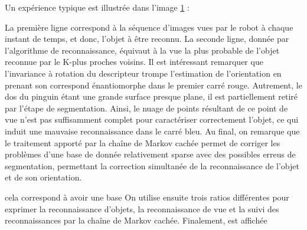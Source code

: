 Un expérience typique est illustrée dans l'image \ref{fig:resultats_expe} :

\begin{figure}[H]
			\caption{}
	\label{fig:resultats_expe}
\end{figure}

La première ligne correspond à la séquence d'images vues par le robot à chaque instant de temps, et donc, l'objet à être reconnu. La seconde ligne, donnée par l'algorithme de reconnaissance, équivaut à la vue la plus probable de l'objet reconnue par le K-plus proches voisins. Il est intéressant remarquer que l'invariance à rotation du descripteur trompe l'estimation de l'orientation en prenant son correspond énantiomorphe dans le premier carré rouge. Autrement, le dos du pinguin étant une grande surface presque plane, il est partiellement retiré par l'étape de segmentation. Ainsi, le nuage de points résultant de ce point de vue n'est pas suffisamment complet pour caractériser correctement l'objet, ce qui induit une mauvaise reconnaissance dans le carré bleu. Au final, on remarque que le traitement apporté par la chaîne de Markov cachée permet de corriger les problèmes d'une base de donnée relativement sparse avec des possibles erreus de segmentation, permettant la correction simultanée de la reconnaissance de l'objet et de son orientation. 

cela correspond à avoir une base
On utilise ensuite trois ratios différentes pour exprimer la reconnaissance d'objets, la reconnaissance de vue et la suivi des reconnaissances par la chaîne de Markov cachée.
Finalement,  est affichée

